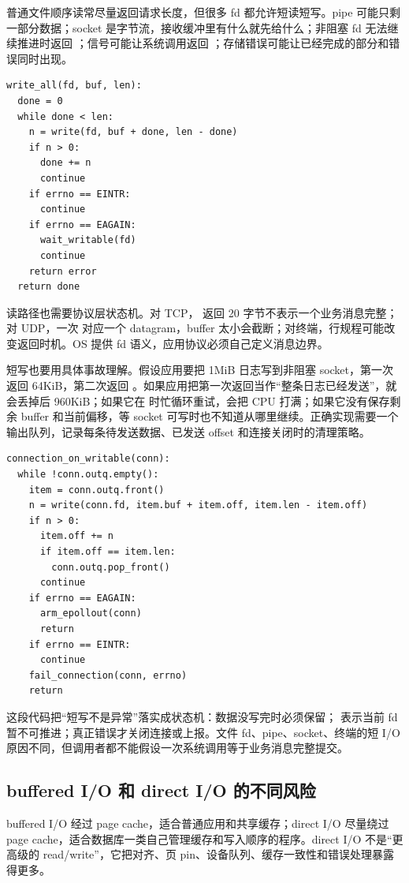 普通文件顺序读常尽量返回请求长度，但很多 fd 都允许短读短写。pipe 可能只剩一部分数据；socket 是字节流，接收缓冲里有什么就先给什么；非阻塞 fd 无法继续推进时返回 ；信号可能让系统调用返回 ；存储错误可能让已经完成的部分和错误同时出现。

\begin{lstlisting}
write_all(fd, buf, len):
  done = 0
  while done < len:
    n = write(fd, buf + done, len - done)
    if n > 0:
      done += n
      continue
    if errno == EINTR:
      continue
    if errno == EAGAIN:
      wait_writable(fd)
      continue
    return error
  return done
\end{lstlisting}

读路径也需要协议层状态机。对 TCP， 返回 20 字节不表示一个业务消息完整；对 UDP，一次  对应一个 datagram，buffer 太小会截断；对终端，行规程可能改变返回时机。OS 提供 fd 语义，应用协议必须自己定义消息边界。

短写也要用具体事故理解。假设应用要把 1MiB 日志写到非阻塞 socket，第一次  返回 64KiB，第二次返回 。如果应用把第一次返回当作“整条日志已经发送”，就会丢掉后 960KiB；如果它在  时忙循环重试，会把 CPU 打满；如果它没有保存剩余 buffer 和当前偏移，等 socket 可写时也不知道从哪里继续。正确实现需要一个输出队列，记录每条待发送数据、已发送 offset 和连接关闭时的清理策略。

\begin{lstlisting}
connection_on_writable(conn):
  while !conn.outq.empty():
    item = conn.outq.front()
    n = write(conn.fd, item.buf + item.off, item.len - item.off)
    if n > 0:
      item.off += n
      if item.off == item.len:
        conn.outq.pop_front()
      continue
    if errno == EAGAIN:
      arm_epollout(conn)
      return
    if errno == EINTR:
      continue
    fail_connection(conn, errno)
    return
\end{lstlisting}

这段代码把“短写不是异常”落实成状态机：数据没写完时必须保留； 表示当前 fd 暂不可推进；真正错误才关闭连接或上报。文件 fd、pipe、socket、终端的短 I/O 原因不同，但调用者都不能假设一次系统调用等于业务消息完整提交。

\subsection{buffered I/O 和 direct I/O 的不同风险}

buffered I/O 经过 page cache，适合普通应用和共享缓存；direct I/O 尽量绕过 page cache，适合数据库一类自己管理缓存和写入顺序的程序。direct I/O 不是“更高级的 read/write”，它把对齐、页 pin、设备队列、缓存一致性和错误处理暴露得更多。

